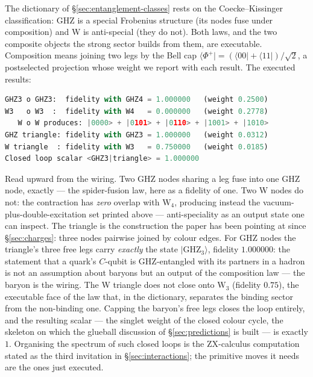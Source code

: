 The dictionary of \S\ref{sec:entanglement-classes} rests on the Coecke--Kissinger classification:
GHZ is a special Frobenius structure (its nodes fuse under composition) and W is anti-special (they
do not). Both laws, and the two composite objects the strong sector builds from them, are
executable. Composition means joining two legs by the Bell cap
$\langle\Phi^+\rvert = (\langle00\rvert + \langle11\rvert)/\sqrt2$, a postselected projection whose
weight we report with each result. The executed results:

\begin{lstlisting}[language=Python,basicstyle=\small\ttfamily]
GHZ3 o GHZ3:  fidelity with GHZ4 = 1.000000   (weight 0.2500)
W3   o W3  :  fidelity with W4   = 0.000000   (weight 0.2778)
   W o W produces: |0000> + |0101> + |0110> + |1001> + |1010>
GHZ triangle: fidelity with GHZ3 = 1.000000   (weight 0.0312)
W triangle  : fidelity with W3   = 0.750000   (weight 0.0185)
Closed loop scalar <GHZ3|triangle> = 1.000000
\end{lstlisting}

Read upward from the wiring. Two GHZ nodes sharing a leg fuse into one GHZ node, exactly --- the
spider-fusion law, here as a fidelity of one. Two W nodes do not: the contraction has \emph{zero}
overlap with $\mathrm{W}_4$, producing instead the vacuum-plus-double-excitation set printed above
--- anti-speciality as an output state one can inspect. The triangle is the construction the paper
has been pointing at since \S\ref{sec:charges}: three nodes pairwise joined by colour edges. For GHZ
nodes the triangle's three free legs carry \emph{exactly} the state $\lvert\mathrm{GHZ}_3\rangle$,
fidelity $1.000000$: the statement that a quark's $C$-qubit is GHZ-entangled with its partners in a
hadron is not an assumption about baryons but an output of the composition law --- the baryon is
the wiring. The W triangle does not close onto $\mathrm{W}_3$ (fidelity $0.75$), the executable
face of the law that, in the dictionary, separates the binding sector from the non-binding one.
Capping the baryon's free legs closes the loop entirely, and the resulting scalar --- the singlet
weight of the closed colour cycle, the skeleton on which the glueball discussion of
\S\ref{sec:predictions} is built --- is exactly $1$. Organising the spectrum of such closed loops
is the ZX-calculus computation stated as the third invitation in \S\ref{sec:interactions}; the
primitive moves it needs are the ones just executed.

